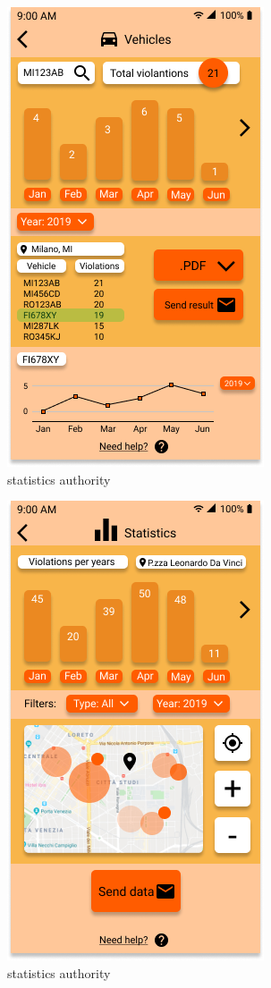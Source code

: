 \documentclass{article}
\begin{document}
\begin{figure}[h!]
    \centering
    \includegraphics[scale=0.5]{img/mockups/statistics_authority_vehicles.png}
    \caption{statistics authority}
\end{figure}

\begin{figure}[h!]
    \centering
    \includegraphics[scale=0.5]{img/mockups/statistics_authority_violations.png}
    \caption{statistics authority}
\end{figure}
\end{document}
